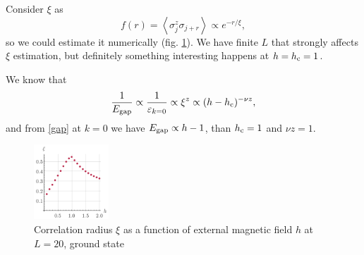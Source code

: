 Consider $\xi$ as
\begin{equation*}
	f(r) = \left\langle \sigma_j^z \sigma_{j+r}\right\rangle \propto e^{- r /\xi},
\end{equation*}
so we could estimate it numerically (fig. \ref{fig:raf}). We have finite $L$ that strongly affects $\xi$ estimation, but definitely something interesting happens at $h=h_{\textnormal{c}}=1$.

 We know that
\begin{equation*}
	\frac{1}{E_{\textnormal{gap}} }  \propto \frac{1}{\varepsilon_{k=0}} \propto  \xi^{z} \propto (h - h_{\textnormal{c}})^{-\nu z},
\end{equation*}
and from \eqref{gap} at $k=0$ we have $E_{\textnormal{gap}} \propto h-1$, than $h_{\textnormal{c}}=1$ and $\nu z = 1$.

\begin{figure}[h]
    \centering
    \includegraphics[width=0.25\textwidth]{imgs/3rad.pdf}
    \caption{Correlation radius $\xi$ as a function of external magnetic field $h$ at $L=20$, ground state}
    \label{fig:raf}
\end{figure}
